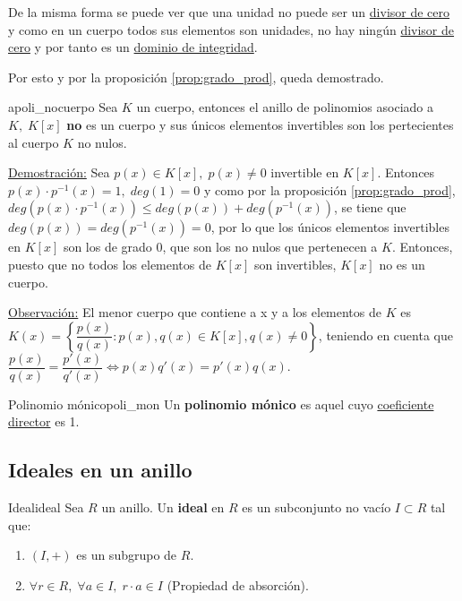 \documentclass[10pt, a4paper]{article}
\newcommand{\obs}{\underline{Observación:} }
\newcommand{\demo}{\underline{Demostración:} }
\begin{document}
De la misma forma se puede ver que una unidad no puede ser un \hyperref[def:div_cero]{divisor de cero} y como en un cuerpo todos sus elementos son unidades, no hay ningún \hyperref[def:div_cero]{divisor de cero} y por tanto es un \hyperref[def:DI]{dominio de integridad}.

Por esto y por la proposición \ref{prop:grado_prod}, queda demostrado.

\begin{proposition}{}{apoli_nocuerpo}
Sea $K$ un cuerpo, entonces el anillo de polinomios asociado a $K, \; K[x]$  \textbf{no} es un cuerpo y sus únicos elementos invertibles son los pertecientes al cuerpo $K$ no nulos.
\end{proposition}

\demo Sea $p(x) \in K[x], \; p(x) \neq 0$ invertible en $K[x]$. Entonces $p(x) \cdot p^{-1}(x) = 1, \; deg(1) = 0$ y como por la proposición \ref{prop:grado_prod}, $deg(p(x) \cdot p^{-1}(x)) \leq deg(p(x)) + deg(p^{-1}(x))$, se tiene que $deg(p(x)) = deg(p^{-1}(x)) = 0$, por lo que los únicos elementos invertibles en $K[x]$ son los de grado 0, que son los no nulos que pertenecen a $K$. Entonces, puesto que no todos los elementos de $K[x]$ son invertibles, $K[x]$ no es un cuerpo.

\vspace{3mm}

\obs El menor cuerpo que contiene a x y a los elementos de $K$ es \\ $K(x) = \left \{ \dfrac{p(x)}{q(x)} : p(x), q(x) \in K[x], q(x) \neq 0 \right \}$, teniendo en cuenta que $\dfrac{p(x)}{q(x)} = \dfrac{p'(x)}{q'(x)} \iff p(x) q'(x) = p'(x) q(x)$.

\begin{definition}{Polinomio mónico}{poli_mon}
Un \textbf{polinomio mónico} es aquel cuyo \hyperref[def:coef_dir]{coeficiente director} es 1.
\end{definition}

\subsection{Ideales en un anillo}

\vspace{3mm}

\begin{definition}{Ideal}{ideal}
Sea $R$ un anillo. Un \textbf{ideal} en $R$ es un subconjunto no vacío $I \subset R$ tal que:
\begin{enumerate}[label=\roman*)]
	\item $(I, +)$ es un subgrupo de $R$.
	\item $\forall r \in R, \; \forall a \in I, \; r \cdot a \in I$ (Propiedad de absorción).
\end{enumerate}
\end{definition}
\end{document}
